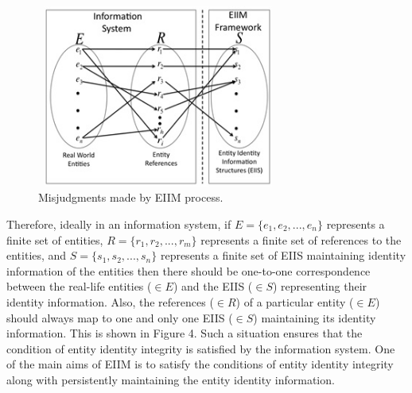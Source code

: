 \begin{figure}[htbp]
  \caption{Misjudgments made by EIIM process.}
\label{identityIntegrity2}
  \centering
    \includegraphics[width=8cm,height=6cm]{Figures/identityIntegrityMDM2.jpg}
\end{figure}


Therefore, ideally in an information system, if $E = \{e_{1},e_{2}, ... ,e_{n}\}$ represents a finite set of entities, $R = \{r_{1},r_{2}, ... ,r_{m}\}$ represents a finite set of references to the entities, and $S = \{s_{1},s_{2}, ... ,s_{n}\}$ represents a finite set of EIIS maintaining identity information of the entities then there should be one-to-one correspondence between the real-life entities ($\in E$) and the EIIS ($\in S$) representing their identity information. Also, the references ($\in R$) of a particular entity ($\in E$) should always map to one and only one EIIS ($\in S$) maintaining its identity information. This is shown in Figure 4. Such a situation ensures that the condition of entity identity integrity is satisfied by the information system. One of the main aims of EIIM is to satisfy the conditions of entity identity integrity along with persistently maintaining the entity identity information.

